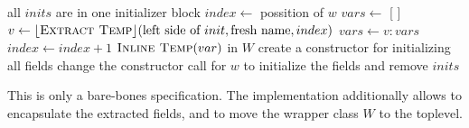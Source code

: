 \begin{algorithm}[p]
\caption{$\refactoring{PassInitsToConstructor}(inits : \listtp{InitializerBlock}, w : Field)$}\label{alg:PassInitsToConstructor}
\begin{algorithmic}[1]
\STATE \assert all $inits$ are in one initializer block
\STATE $index\leftarrow$ possition of $w$
\STATE $vars\leftarrow$ [ ]
  \STATE $v\leftarrow\lfloor\textsc{Extract Temp}\rfloor(\text{left side of $init$}, \text{fresh name}, index)$ 
  \STATE $vars\leftarrow v : vars$
  \STATE $index\leftarrow index + 1$
\ENDFOR
{}
  \STATE $\textsc{Inline Temp}(var)$
\ENDFOR
\STATE in $W$ create a constructor for initializing all fields
\STATE change the constructor call for $w$ to initialize the fields and remove $inits$
\end{algorithmic}
\end{algorithm}

This is only a bare-bones specification. The implementation additionally allows to encapsulate the extracted fields, and to move the wrapper class $W$ to the toplevel.
